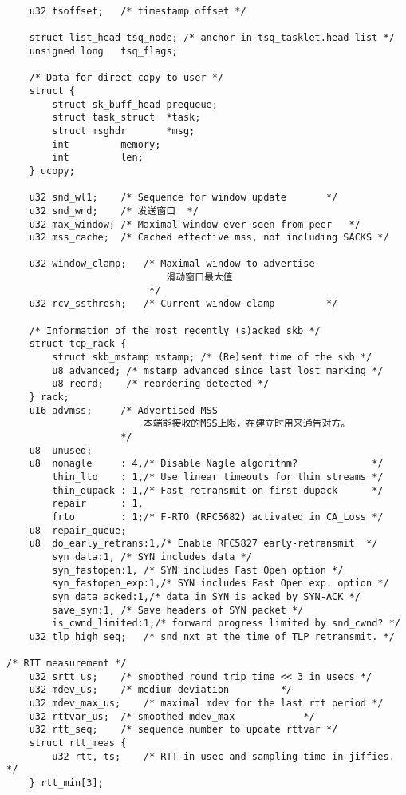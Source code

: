 \begin{verbatim}
    u32 tsoffset;   /* timestamp offset */

    struct list_head tsq_node; /* anchor in tsq_tasklet.head list */
    unsigned long   tsq_flags;

    /* Data for direct copy to user */
    struct {
        struct sk_buff_head prequeue;
        struct task_struct  *task;
        struct msghdr       *msg;
        int         memory;
        int         len;
    } ucopy;

    u32 snd_wl1;    /* Sequence for window update       */
    u32 snd_wnd;    /* 发送窗口  */
    u32 max_window; /* Maximal window ever seen from peer   */
    u32 mss_cache;  /* Cached effective mss, not including SACKS */

    u32 window_clamp;   /* Maximal window to advertise     
                            滑动窗口最大值                     
                         */
    u32 rcv_ssthresh;   /* Current window clamp         */

    /* Information of the most recently (s)acked skb */
    struct tcp_rack {
        struct skb_mstamp mstamp; /* (Re)sent time of the skb */
        u8 advanced; /* mstamp advanced since last lost marking */
        u8 reord;    /* reordering detected */
    } rack;
    u16 advmss;     /* Advertised MSS           
                        本端能接收的MSS上限，在建立时用来通告对方。                 
                    */
    u8  unused;
    u8  nonagle     : 4,/* Disable Nagle algorithm?             */
        thin_lto    : 1,/* Use linear timeouts for thin streams */
        thin_dupack : 1,/* Fast retransmit on first dupack      */
        repair      : 1,
        frto        : 1;/* F-RTO (RFC5682) activated in CA_Loss */
    u8  repair_queue;
    u8  do_early_retrans:1,/* Enable RFC5827 early-retransmit  */
        syn_data:1, /* SYN includes data */
        syn_fastopen:1, /* SYN includes Fast Open option */
        syn_fastopen_exp:1,/* SYN includes Fast Open exp. option */
        syn_data_acked:1,/* data in SYN is acked by SYN-ACK */
        save_syn:1, /* Save headers of SYN packet */
        is_cwnd_limited:1;/* forward progress limited by snd_cwnd? */
    u32 tlp_high_seq;   /* snd_nxt at the time of TLP retransmit. */

/* RTT measurement */
    u32 srtt_us;    /* smoothed round trip time << 3 in usecs */
    u32 mdev_us;    /* medium deviation         */
    u32 mdev_max_us;    /* maximal mdev for the last rtt period */
    u32 rttvar_us;  /* smoothed mdev_max            */
    u32 rtt_seq;    /* sequence number to update rttvar */
    struct rtt_meas {
        u32 rtt, ts;    /* RTT in usec and sampling time in jiffies. */
    } rtt_min[3];


\end{verbatim}
